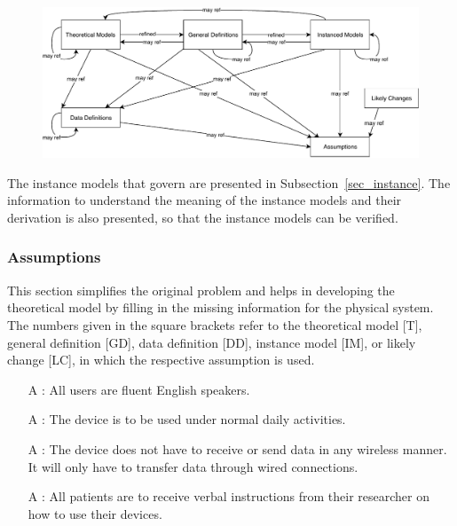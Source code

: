 \documentclass[12pt]{article}
\newcounter{assumpnum} %
\begin{document}
\begin{figure}[H]
  \includegraphics[scale=0.9]{RelationsBetweenTM_GD_IM_DD_A.pdf}
\end{figure}

The instance models that govern \progname{} are presented in
Subsection~\ref{sec_instance}.  The information to understand the meaning of the
instance models and their derivation is also presented, so that the instance
models can be verified.

\subsubsection{Assumptions} \label{sec_assumpt}


This section simplifies the original problem and helps in developing the
theoretical model by filling in the missing information for the physical
system. The numbers given in the square brackets refer to the theoretical model
  [T], general definition [GD], data definition [DD], instance model [IM], or
likely change [LC], in which the respective assumption is used.

\begin{itemize}

\item[A\refstepcounter{assumpnum}\theassumpnum
\label{A1}:]
{All users are fluent English speakers.}

\item[A\refstepcounter{assumpnum}\theassumpnum
\label{A2}:]
{The device is to be used under normal daily activities.}

\item[A\refstepcounter{assumpnum}\theassumpnum
\label{A3}:]
{The device does not have to receive or send data in any wireless manner. It will only have to transfer data through wired connections.}

\item[A\refstepcounter{assumpnum}\theassumpnum
\label{A4}:]
{All patients are to receive verbal instructions from their researcher on how to use their devices.}

\end{itemize}
\end{document}
